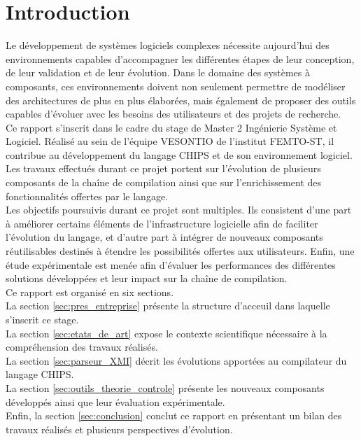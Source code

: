 \section{Introduction}
\label{sec:introduction}

Le développement de systèmes logiciels complexes nécessite aujourd'hui des environnements capables d'accompagner les différentes étapes de leur conception, de leur validation et de leur évolution. Dans le domaine des systèmes à composants, ces environnements doivent non seulement permettre de modéliser des architectures de plus en plus élaborées, mais également de proposer des outils capables d'évoluer avec les besoins des utilisateurs et des projets de recherche. \\

Ce rapport s'inscrit dans le cadre du stage de Master 2 Ingénierie Système et Logiciel. Réalisé au sein de l'équipe VESONTIO de l'institut FEMTO-ST, il contribue au développement du langage CHIPS et de son environnement logiciel. Les travaux effectués durant ce projet portent sur l'évolution de plusieurs composants de la chaîne de compilation ainsi que sur l'enrichissement des fonctionnalités offertes par le langage. \\

Les objectifs poursuivis durant ce projet sont multiples. Ils consistent d'une part à améliorer certains éléments de l'infrastructure logicielle afin de faciliter l'évolution du langage, et d'autre part à intégrer de nouveaux composants réutilisables destinés à étendre les possibilités offertes aux utilisateurs. Enfin, une étude expérimentale est menée afin d'évaluer les performances des différentes solutions développées et leur impact sur la chaîne de compilation. \\

Ce rapport est organisé en six sections. \\

La section \ref{sec:pres_entreprise} présente la structure d'acceuil dans laquelle s'inscrit ce stage. \\

La section \ref{sec:etats_de_art} expose le contexte scientifique nécessaire à la compréhension des travaux 
réalisés. \\

La section \ref{sec:parseur_XMI} décrit les évolutions apportées au compilateur du langage CHIPS. \\ 

La section \ref{sec:outils_theorie_controle} présente les nouveaux composants développés ainsi que leur 
évaluation expérimentale. \\

Enfin, la section \ref{sec:conclusion} conclut ce rapport en présentant un bilan des travaux réalisés 
et plusieurs perspectives d'évolution.


\FloatBarrier

\newpage